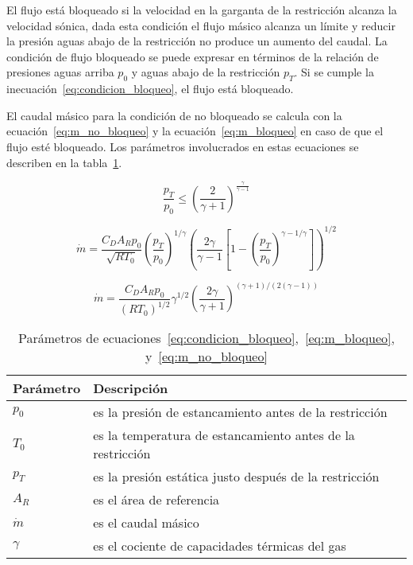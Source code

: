 El flujo está bloqueado si la velocidad en la garganta de la restricción alcanza
la velocidad sónica, dada esta condición el flujo másico alcanza un límite y
reducir la presión aguas abajo de la restricción no produce un aumento del caudal.
%
La condición de flujo bloqueado se puede expresar en términos de la relación de
presiones aguas arriba $p_{0}$ y aguas abajo de la restricción $p_{T}$.
%
Si se cumple la inecuación~\ref{eq:condicion_bloqueo}, el flujo está bloqueado.

El caudal másico para la condición de no bloqueado se calcula con la
ecuación~\ref{eq:m_no_bloqueo} y la ecuación~\ref{eq:m_bloqueo} en caso de que
el flujo esté bloqueado.
%
Los parámetros involucrados en estas ecuaciones se describen en la
tabla~\ref{tab:parametros_cd}.

\begin{equation}\label{eq:condicion_bloqueo}
  \frac{p_{T}}{p_{0}} \le {\left(\frac{2}{\gamma+1}\right)}^{\frac{\gamma}{\gamma - 1}}
\end{equation}

\begin{equation}
    \label{eq:m_no_bloqueo}
    \dot{m} = \frac{C_D A_R p_0}{\sqrt{R T_0}}
            {\left(\frac{p_T}{p_0} \right)}^{1/\gamma}
            {\left( \frac{2\gamma}{\gamma-1} \left[1- {\left(\frac{p_T}{p_0}\right)}^{{\gamma-1}/\gamma} \right] \right)}^{1/2}
\end{equation}

\begin{equation}\label{eq:m_bloqueo}
  \dot{m}=  \frac {C_D A_R p_0} {{(R T_0)}^{1/2}}
            \gamma^{1/2}
            {\left( \frac{2\gamma}{\gamma+1} \right)}^{(\gamma+1)/(2(\gamma-1))}
\end{equation}


\begin{table}
  \centering
  \begin{tabular}{ll}\toprule
    Parámetro & Descripción \\ \midrule
    $p_0$ & es la presión de estancamiento antes de la restricción \\
    $T_0$ & es la temperatura de estancamiento antes de la restricción \\
    $p_T$ & es la presión estática justo después de la restricción \\
    $A_R$ & es el área de referencia \\
    $\dot{m}$ & es el caudal másico \\
    $\gamma$ & es el cociente de capacidades térmicas del gas \\ \bottomrule
  \end{tabular}
  \caption{Parámetros de
ecuaciones~\ref{eq:condicion_bloqueo},~\ref{eq:m_bloqueo},
y~\ref{eq:m_no_bloqueo}}\label{tab:parametros_cd}
\end{table}



